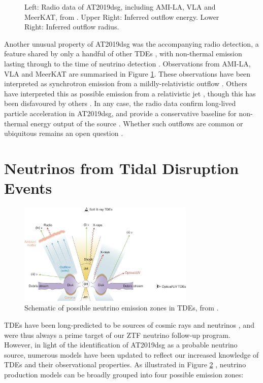 \documentclass[a4paper,11pt]{article}
\begin{document}
\begin{figure}
\begin{subfigure}{0.45\textwidth}
	\end{subfigure}
	\caption{Left: Radio data of AT2019dsg, including AMI-LA, VLA and MeerKAT, from \cite{bran}. Upper Right: Inferred outflow energy. Lower Right: Inferred outflow radius.}
	\label{fig:bran_radio}
\end{figure}

Another unusual property of AT2019dsg was the accompanying radio detection, a feature shared by only a handful of other TDEs \cite{radio_tde_summary}, with non-thermal emission lasting through to the time of neutrino detection \cite{bran}. Observations from AMI-LA, VLA and MeerKAT are summarised in Figure \ref{fig:bran_radio}. These observations have been interpreted as synchrotron emission from a mildly-relativistic outflow \cite{bran, cendes_21, mohan_21, matsumoto_21}. Others have interpreted this as possible emission from a relativistic jet \cite{liu21_bran, winter_bran_21}, though this has been disfavoured by others \cite{mohan_21, cendes_21}. In any case, the radio data confirm long-lived particle acceleration in AT2019dsg, and provide a conservative baseline for non-thermal energy output of the source \cite{bran}. Whether such outflows are common or ubiquitous remains an open question \cite{radio_tde_summary}.

\section{Neutrinos from Tidal Disruption Events}

\begin{figure}[!ht]
	\centering
	\includegraphics[width=0.75\textwidth]{figures/tde_nu}
	\caption{Schematic of possible neutrino emission zones in TDEs, from \cite{hayasaki_21}.}
	\label{fig:tde_nu}
\end{figure}

TDEs have been long-predicted to be sources of cosmic rays and neutrinos \cite{farrar_14}, and were thus always a prime target of our ZTF neutrino follow-up program. However, in light of the identification of AT2019dsg as a probable neutrino source, numerous models have been updated to reflect our increased knowledge of TDEs and their observational properties. As illustrated in Figure \ref{fig:tde_nu} \cite{hayasaki_21}, neutrino production models can be broadly grouped into four possible emission zones:
\end{document}
